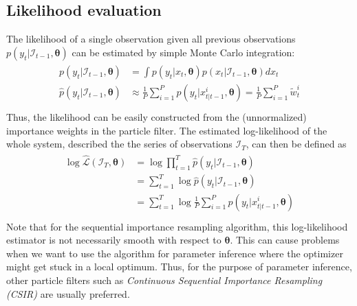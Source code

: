 \documentclass[11pt, oneside]{scrreprt}   	%
\begin{document}
\subsection{Likelihood evaluation}
The likelihood of a single observation given all previous observations $p(y_t | \mathcal{I}_{t-1}, \boldsymbol{\theta})$ can be estimated by simple Monte Carlo integration:\\
\begin{align*} 
\begin{split}
p(y_t | \mathcal{I}_{t-1}, \boldsymbol{\theta}) &= \int p(y_t | x_t, \boldsymbol{\theta}) p(x_t | \mathcal{I}_{t-1}, \boldsymbol{\theta}) d x_t \\
\hat{p}(y_t | \mathcal{I}_{t-1}, \boldsymbol{\theta}) &\approx \frac{1}{P} \sum_{i=1}^P p(y_t | x_{t | t-1}^i, \boldsymbol{\theta}) = \frac{1}{P} \sum_{i=1}^P \tilde{w}_t^i\\
\end{split}					
\end{align*}
Thus, the likelihood can be easily constructed from the (unnormalized) importance weights in the particle filter. The estimated log-likelihood of the whole system, described the the series of observations $\mathcal{I}_T$, can then be defined as\\
\begin{align*} 
\begin{split}
\log \hat{\mathcal{L}}(\mathcal{I}_T, \boldsymbol{\theta}) &= \log \prod_{t=1}^T \hat{p}(y_t | \mathcal{I}_{t-1}, \boldsymbol{\theta}) \\
&= \sum_{t=1}^T \log \hat{p}(y_t | \mathcal{I}_{t-1}, \boldsymbol{\theta}) \\
&= \sum_{t=1}^T \log \frac{1}{P} \sum_{i=1}^P p(y_t | x_{t | t-1}^i, \boldsymbol{\theta}) \\
\end{split}					
\end{align*} 
Note that for the sequential importance resampling algorithm, this log-likelihood estimator is not necessarily smooth with respect to $\boldsymbol{\theta}$. This can cause problems when we want to use the algorithm for parameter inference where the optimizer might get stuck in a local optimum. Thus, for the purpose of parameter inference, other particle filters such as \textit{Continuous Sequential Importance Resampling (CSIR)} are usually preferred.\\

\end{document}
